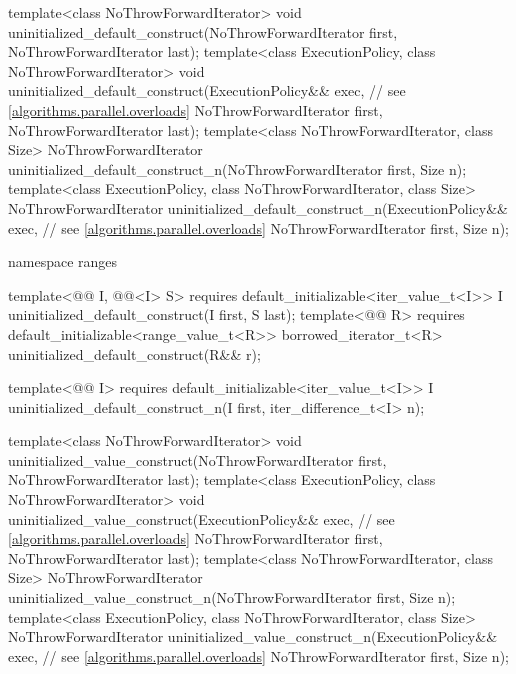 \begin{codeblock}
{  template<class NoThrowForwardIterator>
    void uninitialized_default_construct(NoThrowForwardIterator first,
                                         NoThrowForwardIterator last);
  template<class ExecutionPolicy, class NoThrowForwardIterator>
    void uninitialized_default_construct(ExecutionPolicy&& exec,        // see \ref{algorithms.parallel.overloads}
                                         NoThrowForwardIterator first,
                                         NoThrowForwardIterator last);
  template<class NoThrowForwardIterator, class Size>
    NoThrowForwardIterator
      uninitialized_default_construct_n(NoThrowForwardIterator first, Size n);
  template<class ExecutionPolicy, class NoThrowForwardIterator, class Size>
    NoThrowForwardIterator
      uninitialized_default_construct_n(ExecutionPolicy&& exec,         // see \ref{algorithms.parallel.overloads}
                                        NoThrowForwardIterator first, Size n);

  namespace ranges {
    template<@@ I, @@<I> S>
      requires default_initializable<iter_value_t<I>>
        I uninitialized_default_construct(I first, S last);
    template<@@ R>
      requires default_initializable<range_value_t<R>>
        borrowed_iterator_t<R> uninitialized_default_construct(R&& r);

    template<@@ I>
      requires default_initializable<iter_value_t<I>>
        I uninitialized_default_construct_n(I first, iter_difference_t<I> n);
  }

  template<class NoThrowForwardIterator>
    void uninitialized_value_construct(NoThrowForwardIterator first,
                                       NoThrowForwardIterator last);
  template<class ExecutionPolicy, class NoThrowForwardIterator>
    void uninitialized_value_construct(ExecutionPolicy&& exec,  // see \ref{algorithms.parallel.overloads}
                                       NoThrowForwardIterator first,
                                       NoThrowForwardIterator last);
  template<class NoThrowForwardIterator, class Size>
    NoThrowForwardIterator
      uninitialized_value_construct_n(NoThrowForwardIterator first, Size n);
  template<class ExecutionPolicy, class NoThrowForwardIterator, class Size>
    NoThrowForwardIterator
      uninitialized_value_construct_n(ExecutionPolicy&& exec,   // see \ref{algorithms.parallel.overloads}
                                      NoThrowForwardIterator first, Size n);

}
\end{codeblock}
